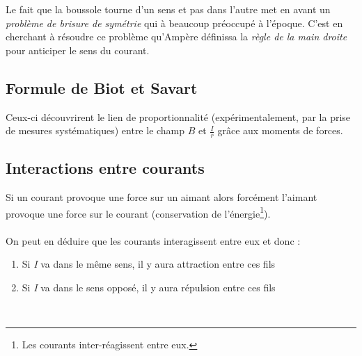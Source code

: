 \documentclass	[11pt, a4paper, openany]{book}
\begin{document}
Le fait que la boussole tourne d'un sens et pas dans l'autre met en avant un \textit{problème de brisure de symétrie} qui à beaucoup préoccupé à l'époque. C'est en cherchant à résoudre ce problème qu'Ampère définissa la \textit{règle de la main droite} pour anticiper le sens du courant.

\subsection{Formule de Biot et Savart}
Ceux-ci découvrirent le lien de proportionnalité (expérimentalement, par la prise de mesures systématiques) entre le champ $B$ et $\frac{I}{r}$ grâce aux moments de forces.

\subsection{Interactions entre courants}
Si un courant provoque une force sur un aimant alors forcément l'aimant provoque une force sur le courant (conservation de l'énergie\footnote{Les courants inter-réagissent entre eux.}).\\\\
On peut en déduire que les courants interagissent entre eux et donc :
\begin{enumerate}
\item Si \textit{I} va dans le même sens, il y aura attraction entre ces fils
\item Si \textit{I} va dans le sens opposé, il y aura répulsion entre ces fils
\end{enumerate}
\ 
\end{document}
